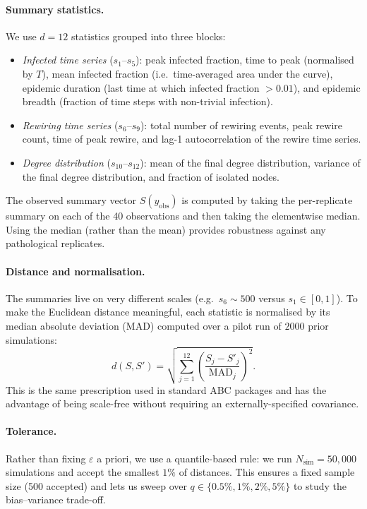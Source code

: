 \documentclass[11pt]{article}
\begin{document}
\paragraph{Summary statistics.} We use $d=12$ statistics grouped into three blocks:
\begin{itemize}[nosep, leftmargin=10pt]
    \item \emph{Infected time series} ($s_1$--$s_5$): peak infected fraction, time to peak (normalised by $T$), mean infected fraction (i.e.\ time-averaged area under the curve), epidemic duration (last time at which infected fraction $> 0.01$), and epidemic breadth (fraction of time steps with non-trivial infection).
    \item \emph{Rewiring time series} ($s_6$--$s_9$): total number of rewiring events, peak rewire count, time of peak rewire, and lag-1 autocorrelation of the rewire time series.
    \item \emph{Degree distribution} ($s_{10}$--$s_{12}$): mean of the final degree distribution, variance of the final degree distribution, and fraction of isolated nodes.
\end{itemize}
The observed summary vector $S(y_{\text{obs}})$ is computed by taking the per-replicate summary on each of the 40 observations and then taking the elementwise median. Using the median (rather than the mean) provides robustness against any pathological replicates.

\paragraph{Distance and normalisation.} The summaries live on very different scales (e.g.\ $s_6 \sim 500$ versus $s_1 \in [0,1]$). To make the Euclidean distance meaningful, each statistic is normalised by its median absolute deviation (MAD) computed over a pilot run of $2000$ prior simulations:
\begin{equation}
d(S, S') = \sqrt{\sum_{j=1}^{12} \left(\frac{S_j - S'_j}{\text{MAD}_j}\right)^2}.
\end{equation}
This is the same prescription used in standard ABC packages and has the advantage of being scale-free without requiring an externally-specified covariance.

\paragraph{Tolerance.} Rather than fixing $\varepsilon$ a priori, we use a quantile-based rule: we run $N_{\text{sim}}=50{,}000$ simulations and accept the smallest $1\%$ of distances. This ensures a fixed sample size (500 accepted) and lets us sweep over $q \in \{0.5\%, 1\%, 2\%, 5\%\}$ to study the bias--variance trade-off.
\end{document}
